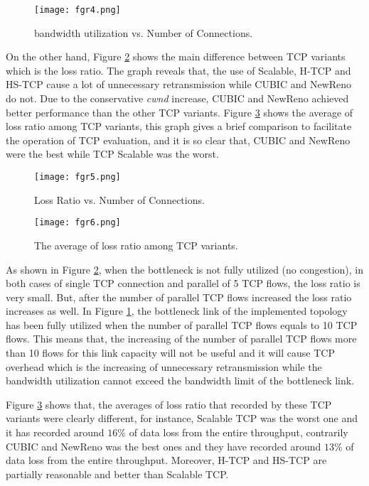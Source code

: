 \documentclass[a4paper, conference]{IEEEtran}
\begin{document}
\begin{figure}[h]
\centerline{\texttt{[image: fgr4.png]}} 
\caption{bandwidth utilization vs. Number of Connections.}
\label{throughput}
\end{figure}

On the other hand, Figure \ref{loss} shows the main difference between TCP variants which is the loss ratio. The graph reveals that, the use of Scalable, H-TCP and HS-TCP cause a lot of unnecessary retransmission while CUBIC and NewReno do not. Due to the conservative \textit{cwnd} increase, CUBIC and NewReno achieved better performance than the other TCP variants. Figure \ref{avg-loss} shows the average of loss ratio among TCP variants, this graph gives a brief comparison to facilitate the operation of TCP evaluation, and it is so clear that, CUBIC and NewReno were the best while TCP Scalable was the worst.

\begin{figure}[h]
\centerline{\texttt{[image: fgr5.png]}} 
\caption{Loss Ratio vs. Number of Connections.}
\label{loss}
\end{figure}

\begin{figure}[h]
\centerline{\texttt{[image: fgr6.png]}} 
\caption{The average of loss ratio among TCP variants.}
\label{avg-loss}
\end{figure}

As shown in Figure \ref{loss}, when the bottleneck is not fully utilized (no congestion), in both cases of single TCP connection and parallel of 5 TCP flows, the loss ratio is very small. But, after the number of parallel TCP flows increased the loss ratio increases as well. In Figure \ref{throughput}, the bottleneck link of the implemented topology has been fully utilized when the number of parallel TCP flows equals to 10 TCP flows. This means that, the increasing of the number of parallel TCP flows more than 10 flows for this link capacity will not be useful and it will cause TCP overhead which is the increasing of unnecessary retransmission while the bandwidth utilization cannot exceed the bandwidth limit of the bottleneck link.

Figure \ref{avg-loss} shows that, the averages of loss ratio that recorded by these TCP variants were clearly different, for instance, Scalable TCP was the worst one and it has recorded around $16\%$ of data loss from the entire throughput, contrarily CUBIC and NewReno was the best ones and they have recorded around $13\%$ of data loss from the entire throughput. Moreover, H-TCP and HS-TCP are partially reasonable and better than Scalable TCP. 
\end{document}
